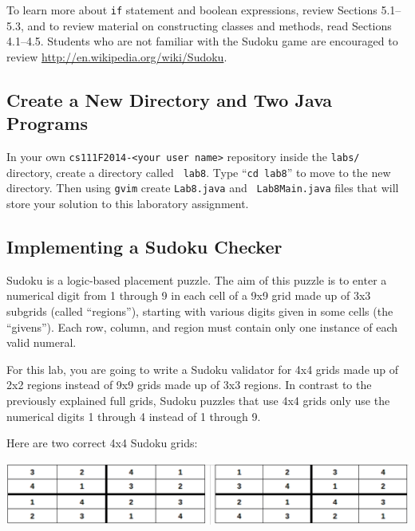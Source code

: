 To learn more about {\tt if} statement and boolean expressions, review Sections 5.1--5.3, and to review material on
constructing classes and methods, read Sections 4.1--4.5.  Students who are not familiar with the Sudoku game are
encouraged to review \url{http://en.wikipedia.org/wiki/Sudoku}.

\vspace{-0.1in}
\subsection*{Create a New Directory and Two Java Programs}
\vspace{-0.05in}

In your own {\tt cs111F2014-<your user name>} repository inside the {\tt labs/} directory, create a directory called {\tt
  lab8}. Type ``{\tt cd lab8}'' to move to the new directory. Then using {\tt gvim} create {\tt Lab8.java} and {\tt
  Lab8Main.java} files that will store your solution to this laboratory assignment.

\vspace{-0.1in}
\subsection*{Implementing a Sudoku Checker}
\vspace{-0.05in}

Sudoku is a logic-based placement puzzle. The aim of this puzzle is to enter a numerical digit from 1 through 9 in each
cell of a 9x9 grid made up of 3x3 subgrids (called ``regions''), starting with various digits given in some cells (the
  ``givens''). Each row, column, and region must contain only one instance of each valid numeral.

\noindent For this lab, you are going to write a Sudoku validator for 4x4 grids made up of 2x2 regions instead of 9x9
grids made up of 3x3 regions.  In contrast to the previously explained full grids, Sudoku puzzles that use 4x4 grids
only use the numerical digits 1 through 4 instead of 1 through 9.

\noindent Here are two correct 4x4 Sudoku grids:

\vspace*{.01in}
\includegraphics[scale=0.3]{grids}

